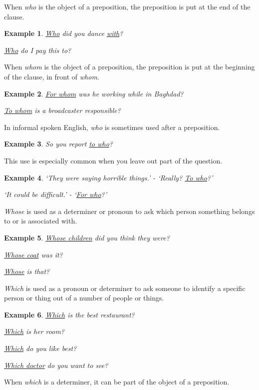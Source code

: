 \documentclass[oneside]{book}
\numberwithin{equation}{section}
\newtheorem{example}{Example}[section]
\begin{document}
When \textit{who} is the object of a preposition, the preposition is put at the end of the clause.
\begin{example}
    \underline{Who} did you dance \underline{with}?
    
    \underline{Who} do I pay this to?
\end{example}
When \textit{whom} is the object of a preposition, the preposition is put at the beginning of the clause, in front of \textit{whom}.
\begin{example}
    \underline{For whom} was he working while in Baghdad?
    
    \underline{To whom} is a broadcaster responsible?
\end{example}
In informal spoken English, \textit{who} is sometimes used after a preposition.
\begin{example}
    So you report \underline{to who}?
\end{example}
This use is especially common when you leave out part of the question.
\begin{example}
    `They were saying horrible things.' - `Really? \underline{To who}?'
    
    `It could be difficult.' - `\underline{For who}?'
\end{example}
%
\noindent{} \textit{Whose} is used as a determiner or pronoun to ask which person something belongs to or is associated with.
\begin{example}
    \underline{Whose children} did you think they were?
    
    \underline{Whose coat} was it?
    
    \underline{Whose} is that?
\end{example}
%
\noindent{} \textit{Which} is used as a pronoun or determiner to ask someone to identify a specific person or thing out of a number of people or things.
\begin{example}
    \underline{Which} is the best restaurant?
    
    \underline{Which} is her room?
    
    \underline{Which} do you like best?
    
    \underline{Which doctor} do you want to see?
\end{example}
When \textit{which} is a determiner, it can be part of the object of a preposition.
\end{document}
